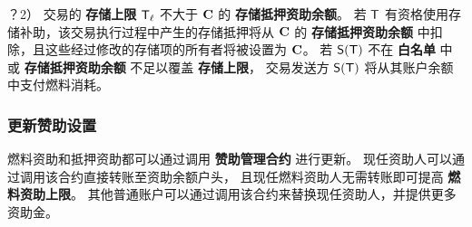 ？2） 交易的 {\bf 存储上限} $\textsf{T}_\ell$ 不大于 $\mathbf{C}$ 的 {\bf 存储抵押资助余额}。
若 $\textsf{T}$ 有资格使用存储补助，该交易执行过程中产生的存储抵押将从 $\mathbf{C}$ 的 \textbf{存储抵押资助余额} 中扣除，且这些经过修改的存储项的所有者将被设置为 $\mathbf{C}$。
若 $\mathsf{S}{\left({\textsf{T}} \right)}$ 不在 \textbf{白名单} 中或 \textbf{存储抵押资助余额} 不足以覆盖 {\bf 存储上限}， 交易发送方 $\mathsf{S}{\left({\textsf{T}} \right)}$ 将从其账户余额中支付燃料消耗。


\subsubsection{更新赞助设置}

燃料资助和抵押资助都可以通过调用 \textbf{赞助管理合约} 进行更新。
现任资助人可以通过调用该合约直接转账至资助余额户头，
且现任燃料资助人无需转账即可提高 \textbf{燃料资助上限}。
其他普通账户可以通过调用该合约来替换现任资助人，并提供更多资助金。



